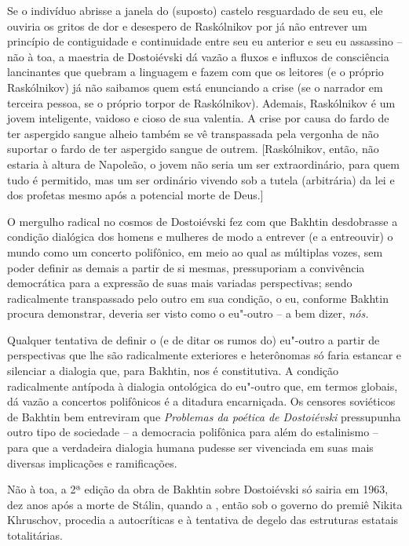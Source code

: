 Se o indivíduo abrisse a janela do (suposto) castelo resguardado de seu
eu, ele ouviria os gritos de dor e desespero de Raskólnikov por já não
entrever um princípio de contiguidade e continuidade entre seu eu
anterior e seu eu assassino -- não à toa, a maestria de Dostoiévski dá
vazão a fluxos e influxos de consciência lancinantes que quebram a
linguagem e fazem com que os leitores (e o próprio Raskólnikov) já não
saibamos quem está enunciando a crise (se o narrador em terceira pessoa,
se o próprio torpor de Raskólnikov). Ademais, Raskólnikov é um jovem
inteligente, vaidoso e cioso de sua valentia. A crise por causa do fardo
de ter aspergido sangue alheio também se vê transpassada pela vergonha
de não suportar o fardo de ter aspergido sangue de outrem.
{[}Raskólnikov, então, não estaria à altura de Napoleão, o jovem não
seria um ser extraordinário, para quem tudo é permitido, mas um ser
ordinário vivendo sob a tutela (arbitrária) da lei e dos profetas mesmo
após a potencial morte de Deus.{]}

O mergulho radical no cosmos de Dostoiévski fez com que Bakhtin
desdobrasse a condição dialógica dos homens e mulheres de modo a
entrever (e a entreouvir) o mundo como um concerto polifônico, em meio
ao qual as múltiplas vozes, sem poder definir as demais a partir de si
mesmas, pressuporiam a convivência democrática para a expressão de suas
mais variadas perspectivas; sendo radicalmente transpassado pelo outro
em sua condição, o eu, conforme Bakhtin procura demonstrar, deveria ser
visto como o eu"-outro -- a bem dizer, \emph{nós.}

Qualquer tentativa de definir o (e de ditar os rumos do) eu"-outro a
partir de perspectivas que lhe são radicalmente exteriores e heterônomas
só faria estancar e silenciar a dialogia que, para Bakhtin, nos é
constitutiva. A condição radicalmente antípoda à dialogia ontológica do
eu"-outro que, em termos globais, dá vazão a concertos polifônicos é a
ditadura encarniçada. Os censores soviéticos de Bakhtin bem entreviram
que \emph{Problemas da poética de Dostoiévski} pressupunha outro tipo de
sociedade -- a democracia polifônica para além do estalinismo -- para
que a verdadeira dialogia humana pudesse ser vivenciada em suas mais
diversas implicações e ramificações.

Não à toa, a 2ª edição da obra de Bakhtin sobre Dostoiévski só
sairia em 1963, dez anos após a morte de Stálin, quando a , então sob o governo do premiê Nikita Khruschov, procedia a autocríticas e à tentativa de degelo das estruturas estatais
totalitárias.


